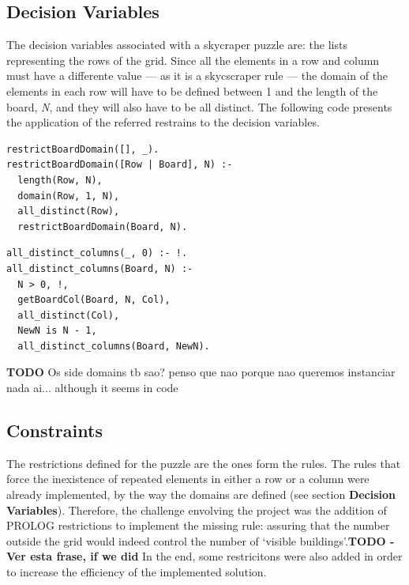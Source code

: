 \documentclass{llncs}
\begin{document}
%
\subsection{Decision Variables}

The decision variables associated with a skycraper puzzle are: the lists representing the rows of the grid. Since all the elements in a row and column must have a differente value --- as it is a skycscraper rule --- the domain of the elements in each row will have to be defined between 1 and the length of the board, \textit{N}, and they will also have to be all distinct. The following code presents the application of the referred restrains to the decision variables.\\

\noindent\begin{minipage}{.44\textwidth}
\begin{lstlisting}[frame= tblr, caption=Row domain restrictions]
restrictBoardDomain([], _).
restrictBoardDomain([Row | Board], N) :-
  length(Row, N),
  domain(Row, 1, N),
  all_distinct(Row),
  restrictBoardDomain(Board, N).
\end{lstlisting}
\end{minipage}\hfill
\begin{minipage}{.5\textwidth}
\begin{lstlisting}[frame=tblr, caption=Column all elelemnts distinct]
all_distinct_columns(_, 0) :- !.
all_distinct_columns(Board, N) :-
  N > 0, !,
  getBoardCol(Board, N, Col),
  all_distinct(Col),
  NewN is N - 1,
  all_distinct_columns(Board, NewN).
\end{lstlisting}
\end{minipage}\hfill

\textbf{TODO} Os side domains tb sao? penso que nao porque nao queremos instanciar nada ai... although it seems in code

%
\subsection{Constraints}

The restrictions defined for the puzzle are the ones form the rules. The rules that force the inexistence of repeated elements in either a row or a column were already implemented, by the way the domains are defined (see section \textbf{Decision Variables}). Therefore, the challenge envolving the project was the addition of PROLOG restrictions to implement the missing rule: assuring that the number outside the grid would indeed control the number of `visible buildings'.\textbf{TODO - Ver esta frase, if we did} In the end, some restricitons were also added in order to increase the efficiency of the implemented solution.\\
\end{document}
